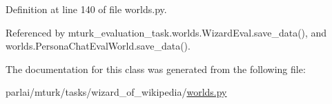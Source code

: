 Definition at line 140 of file worlds.\+py.



Referenced by mturk\+\_\+evaluation\+\_\+task.\+worlds.\+Wizard\+Eval.\+save\+\_\+data(), and worlds.\+Persona\+Chat\+Eval\+World.\+save\+\_\+data().



The documentation for this class was generated from the following file\+:\begin{DoxyCompactItemize}
\item 
parlai/mturk/tasks/wizard\+\_\+of\+\_\+wikipedia/\hyperlink{parlai_2mturk_2tasks_2wizard__of__wikipedia_2worlds_8py}{worlds.\+py}\end{DoxyCompactItemize}

